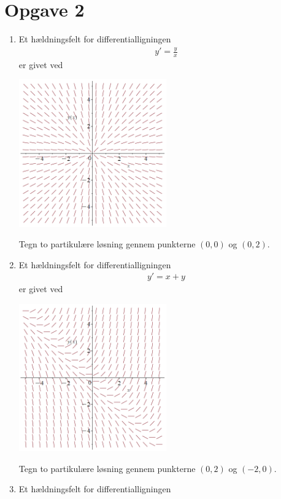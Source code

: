 \section*{Opgave 2}
\begin{enumerate}[label=\roman*)]
	\item Et hældningsfelt for differentialligningen
	\begin{align*}
		y' = \frac{y}{x}
	\end{align*}
	er givet ved
	\begin{center}
		\includegraphics[width = 0.5\textwidth]{Billeder/O1.png}
	\end{center}
	Tegn to partikulære løsning gennem punkterne $(0,0)$ og $(0,2)$.
	\item Et hældningsfelt for differentialligningen
	\begin{align*}
		y' = x + y
	\end{align*}
	er givet ved
	\begin{center}
		\includegraphics[width = 0.5\textwidth]{Billeder/O2.png}
	\end{center}
	Tegn to partikulære løsning gennem punkterne $(0,2)$ og $(-2,0)$.
	\item Et hældningsfelt for differentialligningen
	\begin{align*}

\end{align*}
\end{enumerate}
